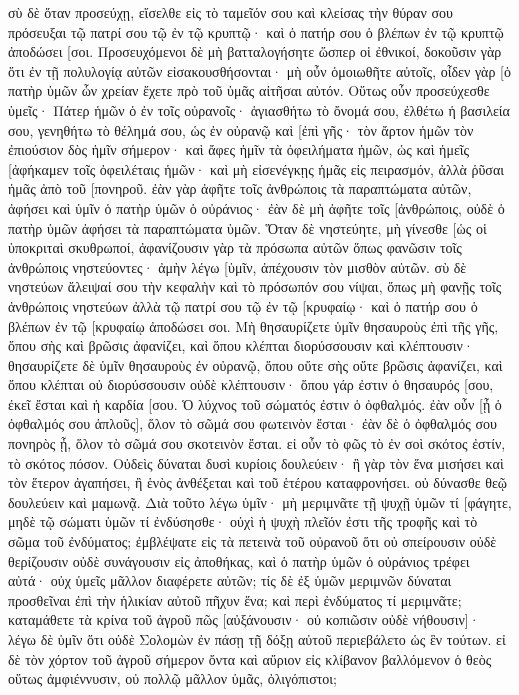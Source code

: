 σὺ δὲ ὅταν προσεύχῃ, εἴσελθε εἰς τὸ ταμεῖόν σου καὶ κλείσας τὴν θύραν σου πρόσευξαι τῷ πατρί σου τῷ ἐν τῷ κρυπτῷ· καὶ ὁ πατήρ σου ὁ βλέπων ἐν τῷ κρυπτῷ ἀποδώσει [σοι. 
Προσευχόμενοι δὲ μὴ βατταλογήσητε ὥσπερ οἱ ἐθνικοί, δοκοῦσιν γὰρ ὅτι ἐν τῇ πολυλογίᾳ αὐτῶν εἰσακουσθήσονται· 
μὴ οὖν ὁμοιωθῆτε αὐτοῖς, οἶδεν γὰρ [ὁ πατὴρ ὑμῶν ὧν χρείαν ἔχετε πρὸ τοῦ ὑμᾶς αἰτῆσαι αὐτόν. 
Οὕτως οὖν προσεύχεσθε ὑμεῖς· Πάτερ ἡμῶν ὁ ἐν τοῖς οὐρανοῖς· ἁγιασθήτω τὸ ὄνομά σου, 
ἐλθέτω ἡ βασιλεία σου, γενηθήτω τὸ θέλημά σου, ὡς ἐν οὐρανῷ καὶ [ἐπὶ γῆς· 
τὸν ἄρτον ἡμῶν τὸν ἐπιούσιον δὸς ἡμῖν σήμερον· 
καὶ ἄφες ἡμῖν τὰ ὀφειλήματα ἡμῶν, ὡς καὶ ἡμεῖς [ἀφήκαμεν τοῖς ὀφειλέταις ἡμῶν· 
καὶ μὴ εἰσενέγκῃς ἡμᾶς εἰς πειρασμόν, ἀλλὰ ῥῦσαι ἡμᾶς ἀπὸ τοῦ [πονηροῦ. 
ἐὰν γὰρ ἀφῆτε τοῖς ἀνθρώποις τὰ παραπτώματα αὐτῶν, ἀφήσει καὶ ὑμῖν ὁ πατὴρ ὑμῶν ὁ οὐράνιος· 
ἐὰν δὲ μὴ ἀφῆτε τοῖς [ἀνθρώποις, οὐδὲ ὁ πατὴρ ὑμῶν ἀφήσει τὰ παραπτώματα ὑμῶν. 
Ὅταν δὲ νηστεύητε, μὴ γίνεσθε [ὡς οἱ ὑποκριταὶ σκυθρωποί, ἀφανίζουσιν γὰρ τὰ πρόσωπα αὐτῶν ὅπως φανῶσιν τοῖς ἀνθρώποις νηστεύοντες· ἀμὴν λέγω [ὑμῖν, ἀπέχουσιν τὸν μισθὸν αὐτῶν. 
σὺ δὲ νηστεύων ἄλειψαί σου τὴν κεφαλὴν καὶ τὸ πρόσωπόν σου νίψαι, 
ὅπως μὴ φανῇς τοῖς ἀνθρώποις νηστεύων ἀλλὰ τῷ πατρί σου τῷ ἐν τῷ [κρυφαίῳ· καὶ ὁ πατήρ σου ὁ βλέπων ἐν τῷ [κρυφαίῳ ἀποδώσει σοι. 
Μὴ θησαυρίζετε ὑμῖν θησαυροὺς ἐπὶ τῆς γῆς, ὅπου σὴς καὶ βρῶσις ἀφανίζει, καὶ ὅπου κλέπται διορύσσουσιν καὶ κλέπτουσιν· 
θησαυρίζετε δὲ ὑμῖν θησαυροὺς ἐν οὐρανῷ, ὅπου οὔτε σὴς οὔτε βρῶσις ἀφανίζει, καὶ ὅπου κλέπται οὐ διορύσσουσιν οὐδὲ κλέπτουσιν· 
ὅπου γάρ ἐστιν ὁ θησαυρός [σου, ἐκεῖ ἔσται καὶ ἡ καρδία [σου. 
Ὁ λύχνος τοῦ σώματός ἐστιν ὁ ὀφθαλμός. ἐὰν οὖν [ᾖ ὁ ὀφθαλμός σου ἁπλοῦς], ὅλον τὸ σῶμά σου φωτεινὸν ἔσται· 
ἐὰν δὲ ὁ ὀφθαλμός σου πονηρὸς ᾖ, ὅλον τὸ σῶμά σου σκοτεινὸν ἔσται. εἰ οὖν τὸ φῶς τὸ ἐν σοὶ σκότος ἐστίν, τὸ σκότος πόσον. 
Οὐδεὶς δύναται δυσὶ κυρίοις δουλεύειν· ἢ γὰρ τὸν ἕνα μισήσει καὶ τὸν ἕτερον ἀγαπήσει, ἢ ἑνὸς ἀνθέξεται καὶ τοῦ ἑτέρου καταφρονήσει. οὐ δύνασθε θεῷ δουλεύειν καὶ μαμωνᾷ. 
Διὰ τοῦτο λέγω ὑμῖν· μὴ μεριμνᾶτε τῇ ψυχῇ ὑμῶν τί [φάγητε, μηδὲ τῷ σώματι ὑμῶν τί ἐνδύσησθε· οὐχὶ ἡ ψυχὴ πλεῖόν ἐστι τῆς τροφῆς καὶ τὸ σῶμα τοῦ ἐνδύματος; 
ἐμβλέψατε εἰς τὰ πετεινὰ τοῦ οὐρανοῦ ὅτι οὐ σπείρουσιν οὐδὲ θερίζουσιν οὐδὲ συνάγουσιν εἰς ἀποθήκας, καὶ ὁ πατὴρ ὑμῶν ὁ οὐράνιος τρέφει αὐτά· οὐχ ὑμεῖς μᾶλλον διαφέρετε αὐτῶν; 
τίς δὲ ἐξ ὑμῶν μεριμνῶν δύναται προσθεῖναι ἐπὶ τὴν ἡλικίαν αὐτοῦ πῆχυν ἕνα; 
καὶ περὶ ἐνδύματος τί μεριμνᾶτε; καταμάθετε τὰ κρίνα τοῦ ἀγροῦ πῶς [αὐξάνουσιν· οὐ κοπιῶσιν οὐδὲ νήθουσιν]· 
λέγω δὲ ὑμῖν ὅτι οὐδὲ Σολομὼν ἐν πάσῃ τῇ δόξῃ αὐτοῦ περιεβάλετο ὡς ἓν τούτων. 
εἰ δὲ τὸν χόρτον τοῦ ἀγροῦ σήμερον ὄντα καὶ αὔριον εἰς κλίβανον βαλλόμενον ὁ θεὸς οὕτως ἀμφιέννυσιν, οὐ πολλῷ μᾶλλον ὑμᾶς, ὀλιγόπιστοι; 
